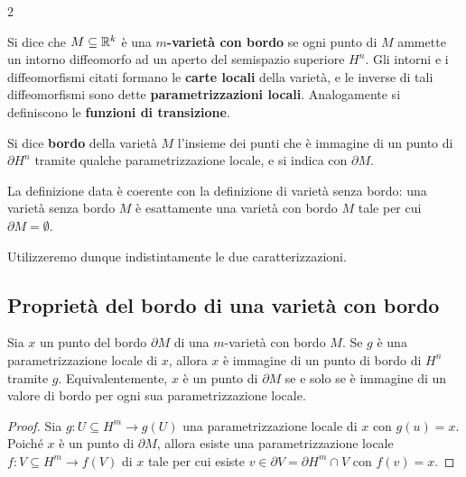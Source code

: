 \begin{multicols*}{2}
    \begin{definition}
        Si dice che $M \subseteq \mathbb{R}^k$ è una \textbf{$m$-varietà con bordo} se
        ogni punto di $M$ ammette un intorno diffeomorfo ad un aperto del semispazio
        superiore $H^n$. Gli intorni e i diffeomorfismi citati formano le
        \textbf{carte locali} della varietà, e le inverse di tali diffeomorfismi
        sono dette \textbf{parametrizzazioni locali}. Analogamente si definiscono
        le \textbf{funzioni di transizione}. \smallskip

        Si dice \textbf{bordo} della varietà $M$ l'insieme dei punti che è immagine
        di un punto di $\partial H^n$ tramite qualche parametrizzazione locale, e
        si indica con $\partial M$.
    \end{definition}

    \begin{remark}
        La definizione data è coerente con la definizione di varietà senza bordo: una
        varietà senza bordo $M$ è esattamente una varietà con bordo $M$ tale per cui
        $\partial M = \emptyset$. \smallskip

        Utilizzeremo dunque indistintamente le due caratterizzazioni.
    \end{remark}

    \subsection{Proprietà del bordo di una varietà con bordo}

    \begin{lemma} \label{lem:punti_di_bordo}
        Sia $x$ un punto del bordo $\partial M$ di una $m$-varietà con bordo $M$. Se
        $g$ è una parametrizzazione locale di $x$, allora $x$ è immagine di un
        punto di bordo di $H^n$ tramite $g$. Equivalentemente, $x$ è un punto di
        $\partial M$ se e solo se è immagine di un valore di bordo per
        ogni sua parametrizzazione locale.
    \end{lemma}

    \begin{proof}
        Sia $g : U \subseteq H^m \to g(U)$ una parametrizzazione locale di $x$ con
        $g(u) = x$. Poiché $x$ è un punto di $\partial M$,
        allora esiste una parametrizzazione locale $f : V \subseteq H^m \to f(V)$
        di $x$ tale per cui esiste $v \in \partial V = \partial H^m \cap V$ con
        $f(v) = x$. \smallskip


\end{proof}
\end{multicols*}
